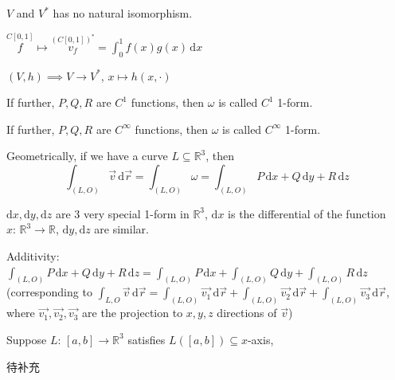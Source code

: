 \begin{remark}
    $V$ and $V^*$ has no natural isomorphism.

    $\overset{C[0,1]}{f}\mapsto\overset{(C[0,1])^*}{v_f}=\int_0^1 f(x)g(x)\,\mathrm{d}x$

    $(V,h)\implies V\to V^*$, $x\mapsto h(x,\cdot)$
\end{remark}

If further, $P,Q,R$ are $C^1$ functions, then $\omega$ is called $C^1$ 1-form.

If further, $P,Q,R$ are $C^\infty$ functions, then $\omega$ is called $C^\infty$ 1-form.

Geometrically, if we have a curve $L\subseteq\mathbb{R}^3$, then
$$\int_{(L,O)}\overrightarrow{v}\,\mathrm{d}\overrightarrow{r}=\int_{(L,O)}\omega=\int_{(L,O)}P\,\mathrm{d}x+Q\,\mathrm{d}y+R\,\mathrm{d}z$$

$\mathrm{d}x,\mathrm{d}y,\mathrm{d}z$ are 3 very special 1-form in $\mathbb{R}^3$, $\mathrm{d}x$ is the differential of the function $x:\,\mathbb{R}^3\to\mathbb{R}$, $\mathrm{d}y,\mathrm{d}z$ are similar.

Additivity: $\int_{(L,O)}P\,\mathrm{d}x+Q\,\mathrm{d}y+R\,\mathrm{d}z=\int_{(L,O)}P\,\mathrm{d}x+\int_{(L,O)}Q\,\mathrm{d}y+\int_{(L,O)}R\,\mathrm{d}z$ (corresponding to $\int_{L,O}\overrightarrow{v}\,\mathrm{d}\overrightarrow{r}=\int_{(L,O)}\overrightarrow{v_1}\,\mathrm{d}\overrightarrow{r}+\int_{(L,O)}\overrightarrow{v_2}\,\mathrm{d}\overrightarrow{r}+\int_{(L,O)}\overrightarrow{v_3}\,\mathrm{d}\overrightarrow{r}$, where $\overrightarrow{v_1},\overrightarrow{v_2},\overrightarrow{v_3}$ are the projection to $x,y,z$ directions of $\overrightarrow{v}$)

\begin{remark}
    Suppose $L:\,[a,b]\to\mathbb{R}^3$ satisfies $L([a,b])\subseteq x$-axis,

    待补充
\end{remark}

